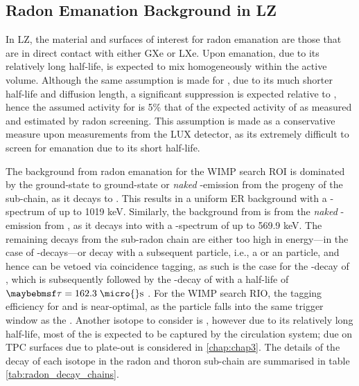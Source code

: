 \subsection{Radon Emanation Background in LZ}
\label{secsec:radon_in_lz}

In LZ, the material and surfaces of interest for radon emanation are those that are in direct contact with either GXe or LXe. Upon emanation, due to its relatively long half-life, \RnTTT{} is expected to mix homogeneously within the active volume. Although the same assumption is made for \RnTTZ{}, due to its much shorter half-life and diffusion length, a significant suppression is expected relative to \RnTTT{}, hence the assumed activity for \RnTTZ{} is 5\% that of the expected activity of \RnTTT{} as measured and estimated by radon screening. This assumption is made as a conservative measure upon measurements from the LUX detector, as its extremely difficult to screen for \RnTTZ{} emanation due to its short half-life.

The background from radon emanation for the WIMP search ROI is dominated by the ground-state to ground-state or \textit{naked} \beta-emission from the \PbTOF{} progeny of the \RnTTT{} sub-chain, as it decays to \BiTOF. This results in a uniform ER background with a \beta-spectrum of up to 1019 keV. Similarly, the background from \RnTTZ{} is from the \textit{naked} \beta-emission from \PbTOT{}, as it decays into \BiTOT{} with a \beta-spectrum of up to 569.9 keV. The remaining decays from the sub-radon chain are either too high in energy---in the case of \alpha-decays---or decay with a subsequent particle, i.e., a \gray{} or an \alpha particle, and hence can be vetoed via coincidence tagging, as such is the case for the \beta-decay of \BiTOF{}, which is subsequently followed by the \alpha-decay of \PbTOF{} with a half-life of $\tau{} = 162.3 \; \MathText{\micro{}s}$ \cite{radiogenic_muon_lux,Araujo:2011as}. For the WIMP search RIO, the tagging efficiency for \BiPoTOF{} and \BiPoTOT{} is near-optimal, as the \alpha{} particle falls into the same trigger window as the \beta{}. Another isotope to consider is \BiTOZ{}, however due to its relatively long half-life, most of the \BiTOZ{} is expected to be captured by the circulation system; \BiTOZ{} due on TPC surfaces due to plate-out is considered in \ref{chap:chap3}. The details of the decay of each isotope in the radon and thoron sub-chain are summarised in table \ref{tab:radon_decay_chains}.

